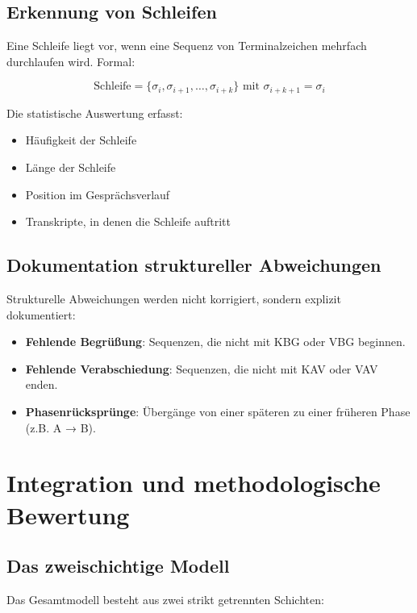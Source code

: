 \documentclass[
  12pt,
  a4paper,
  oneside,
  titlepage
]{article}
\begin{document}
\subsection{Erkennung von Schleifen}

Eine Schleife liegt vor, wenn eine Sequenz von Terminalzeichen mehrfach 
durchlaufen wird. Formal:

\[
\text{Schleife} = \{\sigma_i, \sigma_{i+1}, \ldots, \sigma_{i+k}\} \text{ mit } \sigma_{i+k+1} = \sigma_i
\]

Die statistische Auswertung erfasst:
\begin{itemize}
    \item Häufigkeit der Schleife
    \item Länge der Schleife
    \item Position im Gesprächsverlauf
    \item Transkripte, in denen die Schleife auftritt
\end{itemize}

\subsection{Dokumentation struktureller Abweichungen}

Strukturelle Abweichungen werden nicht korrigiert, sondern explizit 
dokumentiert:

\begin{itemize}
    \item \textbf{Fehlende Begrüßung}: Sequenzen, die nicht mit KBG 
    oder VBG beginnen.
    
    \item \textbf{Fehlende Verabschiedung}: Sequenzen, die nicht mit 
    KAV oder VAV enden.
    
    \item \textbf{Phasenrücksprünge}: Übergänge von einer späteren 
    zu einer früheren Phase (z.B. A → B).
\end{itemize}

\section{Integration und methodologische Bewertung}

\subsection{Das zweischichtige Modell}

Das Gesamtmodell besteht aus zwei strikt getrennten Schichten:
\end{document}
